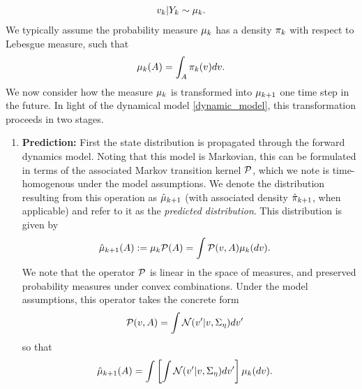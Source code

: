 \documentclass[12pt]{article}
\begin{document}
\begin{align}
\dstate|\dataObsCum \sim \filterMeas.
\end{align}
We typically assume the probability measure $\filterMeas$ has a density $\filterDens$ with respect to Lebesgue measure, such that 
\[
\filterMeas(A) = \int_A \filterDens(\state) d\state. 
\]
We now consider how the measure $\filterMeas$ is transformed into $\filterMeas[\timeStep+1]$ one time step in the future. In light of the dynamical model \ref{dynamic_model}, this transformation 
proceeds in two stages. 
\begin{enumerate}
\item \textbf{Prediction:} First the state distribution is propagated through the forward dynamics model. Noting that this model is Markovian, this can be formulated in terms of the associated 
Markov transition kernel $\predictOp$, which we note is time-homogenous under the model assumptions. We denote the distribution resulting from this operation as $\predictMeas[\timeStep+1]$
(with associated density $\predictDens[\timeStep+1]$, when applicable) and refer to it as the \textit{predicted distribution}. This distribution is given by 
\begin{align}
\predictMeas[\timeStep+1](A) := \filterMeas \predictOp(A) &= \int \predictOp(\state, A) \filterMeas(d\state).
\end{align}
We note that the operator $\predictOp$ is linear in the space of measures, and preserved probability measures under convex combinations. Under the model assumptions, this operator 
takes the concrete form 
\begin{align*}
\predictOp(\state, A) &= \int \Gaussian(\state^\prime | \state, \CovNoiseDynamic) d\state^\prime
\end{align*}
so that 
\begin{align}
\predictMeas[\timeStep+1](A) &= \int \left[\int \Gaussian(\state^\prime | \state, \CovNoiseDynamic) d\state^\prime\right] \filterMeas(d\state). \label{predict_integral}
\end{align}


\end{enumerate}
\end{document}
